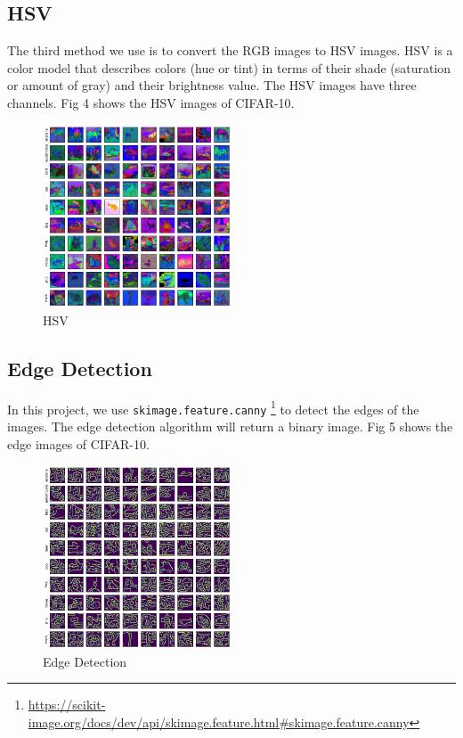 \documentclass[11pt]{article}
\begin{document}
\subsection{HSV}
The third method we use is to convert the RGB images to HSV images. HSV is a color model that describes colors (hue or tint) in terms of their shade (saturation or amount of gray) and their brightness value. The HSV images have three channels.
Fig 4 shows the HSV images of CIFAR-10.
\begin{figure}[h]
    \centering
    \includegraphics[width=0.5\textwidth]{hsv.png}
    \caption{HSV}
    \label{fig:hsv}
\end{figure}

\subsection{Edge Detection}
In this project, we use \verb|skimage.feature.canny|
\footnote{\url{https://scikit-image.org/docs/dev/api/skimage.feature.html#skimage.feature.canny}}
to detect the edges of the images. The edge detection algorithm will return a binary image.
Fig 5 shows the edge images of CIFAR-10.
\begin{figure}[h]
    \centering
    \includegraphics[width=0.5\textwidth]{canny.png}
    \caption{Edge Detection}
    \label{fig:edge}
\end{figure}
\end{document}
